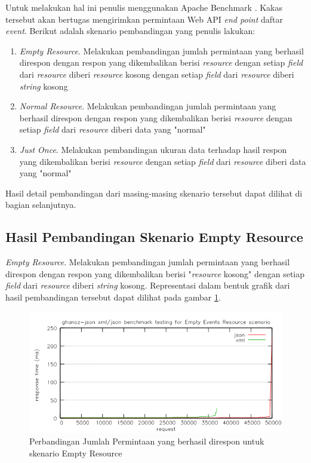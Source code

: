 \documentclass{llncs}
\begin{document}
Untuk melakukan hal ini penulis menggunakan Apache Benchmark \cite{ab}. Kakas tersebut akan bertugas mengirimkan permintaan Web API \textit{end point} daftar \textit{event}. Berikut adalah skenario pembandingan yang penulis lakukan:

\begin{enumerate}
  \item \textit{Empty Resource}. Melakukan pembandingan jumlah permintaan yang berhasil direspon dengan respon yang dikembalikan berisi \textit{resource} dengan setiap \textit{field} dari \textit{resource} diberi \textit{resource} kosong dengan setiap \textit{field} dari \textit{resource} diberi \textit{string} kosong
  \item \textit{Normal Resource}. Melakukan pembandingan jumlah permintaan yang berhasil direspon dengan respon yang dikembalikan berisi \textit{resource} dengan setiap \textit{field} dari \textit{resource} diberi data yang "normal"
  \item \textit{Just Once}. Melakukan pembandingan ukuran data terhadap hasil respon yang dikembalikan berisi \textit{resource} dengan setiap \textit{field} dari \textit{resource} diberi data yang "normal"
\end{enumerate}

Hasil detail pembandingan dari masing-masing skenario tersebut dapat dilihat di bagian selanjutnya.

\subsection{Hasil Pembandingan Skenario Empty Resource}

\onehalfspacing \textit{Empty Resource}. Melakukan pembandingan jumlah permintaan yang berhasil direspon dengan respon yang dikembalikan berisi "\textit{resource} kosong" dengan setiap \textit{field} dari \textit{resource} diberi \textit{string} kosong. Representasi dalam bentuk grafik dari hasil pembandingan tersebut dapat dilihat pada gambar \ref{benchmark-empty-resource}.

\begin{figure}[htp]
\centering
\includegraphics[scale=0.65]{images/benchmark-empty-resource.png}
\caption{Perbandingan Jumlah Permintaan yang berhasil direspon untuk skenario Empty Resource}
\label{benchmark-empty-resource}
\end{figure}
\end{document}
